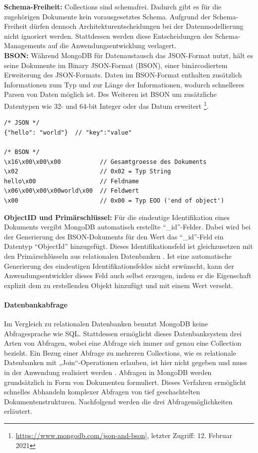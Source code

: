 \noindent
\textbf{Schema-Freiheit:}
Collections sind schemafrei. Dadurch gibt es für die zugehörigen Dokumente kein vorausgesetztes Schema. Aufgrund der Schema-Freiheit dürfen dennoch Architekturentscheidungen bei der Datenmodellierung nicht ignoriert werden. Stattdessen werden diese Entscheidungen des Schema-Managements auf die Anwendungsentwicklung verlagert. \\

\noindent
\textbf{BSON:}
Während MongoDB für Datenaustausch das JSON-Format nutzt, hält es seine Dokumente im Binary JSON-Format (BSON), einer binärcodiertem Erweiterung des JSON-Formats. Daten im BSON-Format enthalten zusätzlich Informationen zum Typ und zur Länge der Informationen, wodurch schnelleres Parsen von Daten möglich ist. Des Weiteren ist BSON um zusätzliche Datentypen wie 32- und 64-bit Integer oder das Datum erweitert \footnote{\url{https://www.mongodb.com/json-and-bson]}, letzter Zugriff: 12. Februar 2021}.

\begin{lstlisting}[caption=JSON - BSON Vergleich, label=lst:JSONBSON]
/* JSON */
{"hello": "world"}  // "key":"value"

/* BSON */
\x16\x00\x00\x00           // Gesamtgroesse des Dokuments
\x02                       // 0x02 = Typ String
hello\x00                  // Feldname
\x06\x00\x00\x00world\x00  // Feldwert
\x00                       // 0x00 = Typ EOO ('end of object')
\end{lstlisting}


\noindent
\textbf{ObjectID und Primärschlüssel:}
Für die eindeutige Identifikation eines Dokuments vergibt MongoDB automatisch erstellte \enquote{\_id}-Felder. Dabei wird bei der Generierung des BSON-Dokuments für den Wert das \enquote{\_id}-Feld ein Datentyp \enquote{ObjectId}  hinzugefügt. Dieses Identifikationsfeld ist gleichzusetzen mit den Primärschlüsseln aus relationalen Datenbanken \cite{DB1.85}. Ist eine automatische Generierung des eindeutigen Identifikationsfeldes nicht erwünscht, kann der Anwendungsentwickler dieses Feld auch selbst erzeugen, indem er die Eigenschaft explizit dem zu erstellenden Objekt hinzufügt und mit einem Wert verseht.
\newline

\paragraph{Datenbankabfrage}
Im Vergleich zu relationalen Datenbanken benutzt MongoDB keine Abfragesprache wie SQL. Stattdessen ermöglicht dieses Datenbanksystem drei Arten von Abfragen, wobei eine Abfrage sich immer auf genau eine Collection bezieht. Ein Bezug einer Abfrage zu mehreren Collections, wie es relationale Datenbanken mit „Join“-Operationen erlauben, ist hier nicht gegeben und muss in der Anwendung realisiert werden \cite{DB1.9}. Abfragen in MongoDB werden grundsätzlich in Form von Dokumenten formuliert. Dieses Verfahren ermöglicht schnelles Abhandeln komplexer Abfragen von tief geschachtelten Dokumentenstrukturen. Nachfolgend werden die drei Abfragemöglichkeiten erläutert.\\

